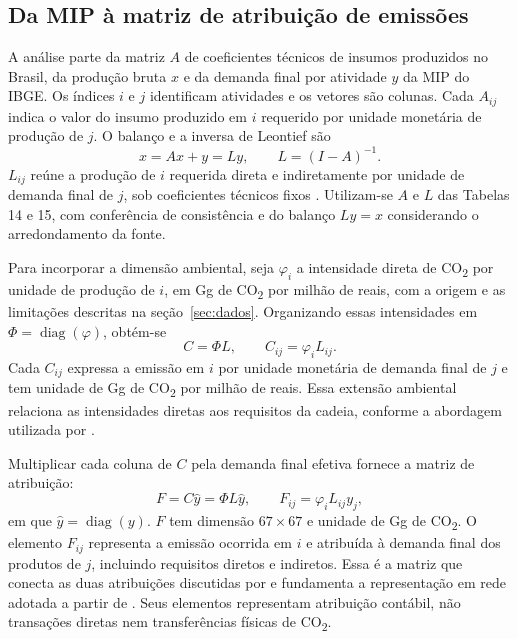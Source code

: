 \subsection{Da MIP à matriz de atribuição de emissões}
\label{sec:derivacao}

A análise parte da matriz $A$ de coeficientes técnicos de insumos produzidos no Brasil, da produção bruta $x$ e da demanda final por atividade $y$ da MIP do IBGE. Os índices $i$ e $j$ identificam atividades e os vetores são colunas. Cada $A_{ij}$ indica o valor do insumo produzido em $i$ requerido por unidade monetária de produção de $j$. O balanço e a inversa de Leontief são
\begin{equation}
x=Ax+y=Ly,\qquad L=(I-A)^{-1}.
\label{eq:leontief}
\end{equation}
$L_{ij}$ reúne a produção de $i$ requerida direta e indiretamente por unidade de demanda final de $j$, sob coeficientes técnicos fixos \parencite{millerBlair2009}. Utilizam-se $A$ e $L$ das Tabelas 14 e 15, com conferência de consistência e do balanço $Ly=x$ considerando o arredondamento da fonte.

Para incorporar a dimensão ambiental, seja $\varphi_i$ a intensidade direta de CO\textsubscript{2} por unidade de produção de $i$, em Gg de CO\textsubscript{2} por milhão de reais, com a origem e as limitações descritas na seção~\ref{sec:dados}. Organizando essas intensidades em $\Phi=\operatorname{diag}(\varphi)$, obtém-se
\begin{equation}
C=\Phi L,\qquad C_{ij}=\varphi_iL_{ij}.
\label{eq:coeficientes-emissoes}
\end{equation}
Cada $C_{ij}$ expressa a emissão em $i$ por unidade monetária de demanda final de $j$ e tem unidade de Gg de CO\textsubscript{2} por milhão de reais. Essa extensão ambiental relaciona as intensidades diretas aos requisitos da cadeia, conforme a abordagem utilizada por \textcite{sanguinetAzzoni2024}.

Multiplicar cada coluna de $C$ pela demanda final efetiva fornece a matriz de atribuição:
\begin{equation}
F=C\widehat y=\Phi L\widehat y,\qquad F_{ij}=\varphi_iL_{ij}y_j,
\label{eq:matriz-atribuicao}
\end{equation}
em que $\widehat y=\operatorname{diag}(y)$. $F$ tem dimensão $67\times67$ e unidade de Gg de CO\textsubscript{2}. O elemento $F_{ij}$ representa a emissão ocorrida em $i$ e atribuída à demanda final dos produtos de $j$, incluindo requisitos diretos e indiretos. Essa é a matriz que conecta as duas atribuições discutidas por \textcite{marques2012} e fundamenta a representação em rede adotada a partir de \textcite{huang2019}. Seus elementos representam atribuição contábil, não transações diretas nem transferências físicas de CO\textsubscript{2}.

